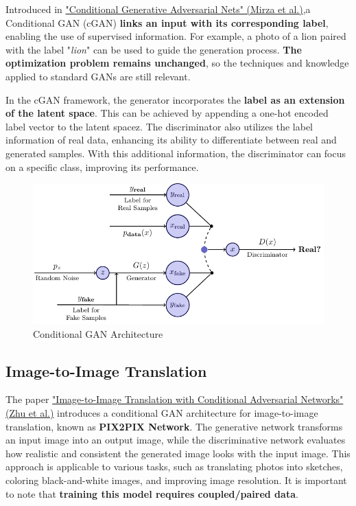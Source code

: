Introduced in \href{https://arxiv.org/pdf/1411.1784}{"Conditional Generative Adversarial Nets" (Mirza et al.)},a Conditional GAN (cGAN) \textbf{links an input with its corresponding label}, enabling the use of supervised information. For example, a photo of a lion paired with the label "\textit{lion}" can be used to guide the generation process. \textbf{The optimization problem remains unchanged}, so the techniques and knowledge applied to standard GANs are still relevant.

In the cGAN framework, the generator incorporates the \textbf{label as an extension of the latent space}. This can be achieved by appending a one-hot encoded label vector to the latent spacez. The discriminator also utilizes the label information of real data, enhancing its ability to differentiate between real and generated samples. With this additional information, the discriminator can focus on a specific class, improving its performance.

\begin{figure}[!htbp]
    \centering
    \includegraphics[width=\linewidth]{tikz/chapter9 - Conditional GAN.pdf}
    \caption{Conditional GAN Architecture}
\end{figure}


\subsection{Image-to-Image Translation}

The paper \href{https://arxiv.org/pdf/1611.07004}{"Image-to-Image Translation with Conditional Adversarial Networks" (Zhu et al.)} introduces a conditional GAN architecture for image-to-image translation, known as \textbf{PIX2PIX Network}. The generative network transforms an input image into an output image, while the discriminative network evaluates how realistic and consistent the generated image looks with the input image. This approach is applicable to various tasks, such as translating photos into sketches, coloring black-and-white images, and improving image resolution. It is important to note that \textbf{training this model requires coupled/paired data}.


